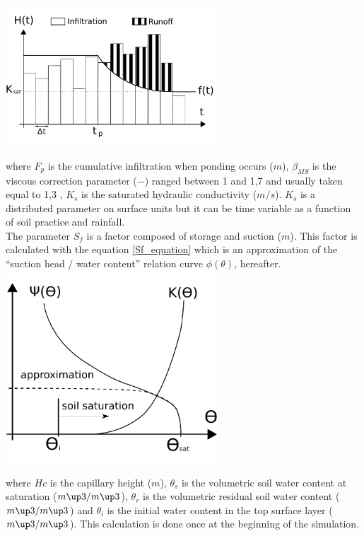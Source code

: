 \includegraphics[width=8cm]{common/Separation_infiltration_ruissellement_MSeytoux.pdf}


where $F_p$ is the cumulative infiltration when ponding occurs ($m$), $\beta_{MS}$ is the viscous correction parameter ($-$) ranged between 1 and 1,7 and usually taken equal to 1,3 \cite{MorelS1984}, $K_s$ is the saturated hydraulic conductivity ($m/s$). $K_s$ is a distributed parameter on surface units but it can be time variable as a function of soil practice and rainfall.\\

The parameter $S_f$ is a factor composed of storage and suction ($m$). This factor is calculated with the equation \ref{Sf_equation} which is an approximation of the ``suction head / water content'' relation curve $\phi(\theta)$, hereafter.\\

\includegraphics[width=8cm]{common/Sf_approximation.pdf}


where $Hc$ is the capillary height ($m$), $\theta_s$  is the volumetric soil water content at saturation ($m\up3/m\up3$), $\theta_r$ is the volumetric residual soil water content ($m\up3 /m\up3$) and $\theta_i$ is the initial water content in the top surface layer ($m\up3 /m\up3$). This calculation is done once at the beginning of the simulation.\\

